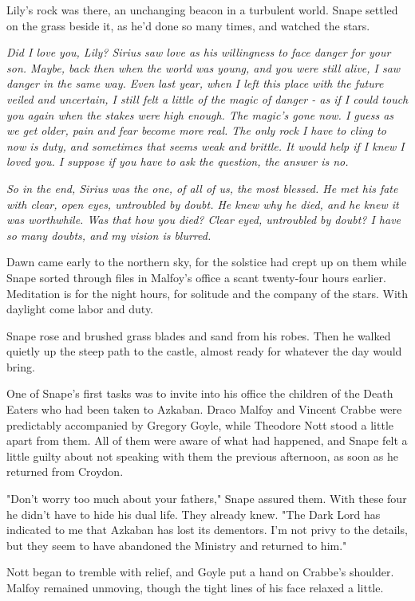 Lily's rock was there, an unchanging beacon in a turbulent world. Snape settled on the grass beside it, as he'd done so many times, and watched the stars.

\emph{Did I love you, Lily? Sirius saw love as his willingness to face danger for your son. Maybe, back then when the world was young, and you were still alive, I saw danger in the same way. Even last year, when I left this place with the future veiled and uncertain, I still felt a little of the magic of danger - as if I could touch you again when the stakes were high enough. The magic's gone now. I guess as we get older, pain and fear become more real. The only rock I have to cling to now is duty, and sometimes that seems weak and brittle. It would help if I knew I loved you. I suppose if you have to ask the question, the answer is no.}

\emph{So in the end, Sirius was the one, of all of us, the most blessed. He met his fate with clear, open eyes, untroubled by doubt. He knew why he died, and he knew it was worthwhile. Was that how you died? Clear eyed, untroubled by doubt? I have so many doubts, and my vision is blurred.}

Dawn came early to the northern sky, for the solstice had crept up on them while Snape sorted through files in Malfoy's office a scant twenty-four hours earlier. Meditation is for the night hours, for solitude and the company of the stars. With daylight come labor and duty.

Snape rose and brushed grass blades and sand from his robes. Then he walked quietly up the steep path to the castle, almost ready for whatever the day would bring.

One of Snape's first tasks was to invite into his office the children of the Death Eaters who had been taken to Azkaban. Draco Malfoy and Vincent Crabbe were predictably accompanied by Gregory Goyle, while Theodore Nott stood a little apart from them. All of them were aware of what had happened, and Snape felt a little guilty about not speaking with them the previous afternoon, as soon as he returned from Croydon.

"Don't worry too much about your fathers," Snape assured them. With these four he didn't have to hide his dual life. They already knew. "The Dark Lord has indicated to me that Azkaban has lost its dementors. I'm not privy to the details, but they seem to have abandoned the Ministry and returned to him."

Nott began to tremble with relief, and Goyle put a hand on Crabbe's shoulder. Malfoy remained unmoving, though the tight lines of his face relaxed a little.

